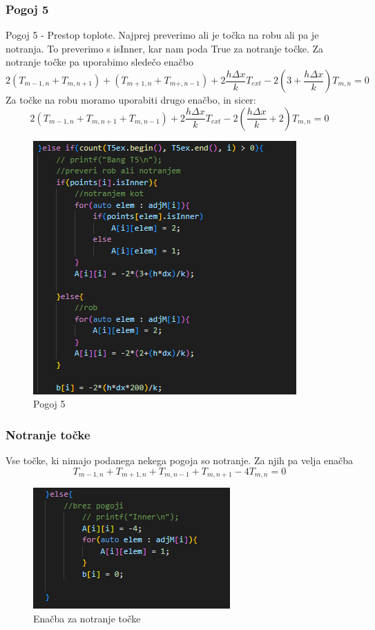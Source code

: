 \documentclass[12pt]{article}
\begin{document}
 \subsubsection{Pogoj 5}
        Pogoj 5 - Prestop toplote.\newline
        Najprej preverimo ali je točka na robu ali pa je notranja. To preverimo s isInner, kar nam poda True za notranje točke. Za notranje točke pa uporabimo sledečo enačbo
        $$2(T_{m-1,n}+T_{m,n+1})+(T_{m+1,n}+T_{m+,n-1})+2\frac{h \Delta x}{k}T_{ext}-2(3+\frac{h\Delta x}{k})T_{m,n}=0$$
        Za točke na robu moramo uporabiti drugo enačbo, in sicer:
        $$2(T_{m-1,n}+T_{m,n+1}+T_{m,n-1})+2\frac{h\Delta x}{k}T_{ext}-2(\frac{h\Delta x}{k}+2)T_{m,n}=0$$
            \begin{figure}[ht]
                \centering
                \includegraphics[width=0.5\linewidth]{pogoj5.png}
                \renewcommand*\figurename{Slika}
                \caption{Pogoj 5}
                \label{Slika:9}
            \end{figure}
        \FloatBarrier
\subsubsection{Notranje točke}
     Vse točke, ki nimajo podanega nekega pogoja so notranje. Za njih pa velja enačba 
        $$T_{m-1,n}+T_{m+1,n}+T_{m,n-1}+T_{m,n+1}-4T_{m,n}=0$$
            \begin{figure}[ht]
                \centering
                \includegraphics[width=0.5\linewidth]{ostaliPogoji.png}
                \renewcommand*\figurename{Slika}
                \caption{Enačba za notranje točke}
                \label{Slika:10}
            \end{figure}
    \FloatBarrier
\end{document}

